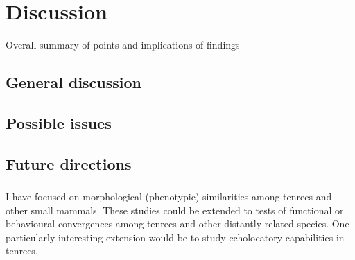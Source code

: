 \chapter{Discussion}
\label{chap:discussion}



\noindent
Overall summary of points and implications of findings

\section{General discussion}
	
\section{Possible issues}



\section{Future directions}

\subsection{}

\subsection{}

\subsection{} 


\subsection{}

	I have focused on morphological (phenotypic) similarities among tenrecs and other small mammals. These studies could be extended to tests of functional or behavioural convergences among tenrecs and other distantly related species.
	One particularly interesting extension would be to study echolocatory capabilities in tenrecs.

